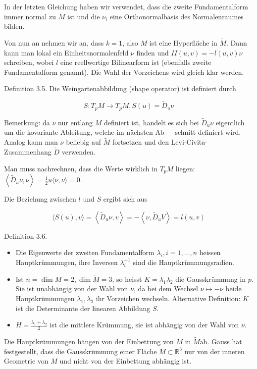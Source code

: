 \documentclass[10pt]{article}
\begin{document}
In der letzten Gleichung haben wir verwendet, dass die zweite Fundamentalform immer normal zu $M$ ist und die $\nu_{i}$ eine Orthonormalbasis des Normalenraumes bilden.

Von nun an nehmen wir an, dass $k=1$, also $M$ ist eine Hyperfläche in $\tilde{M}$. Dann kann man lokal ein Einheitsnormalenfeld $\nu$ finden und $I I(u, v)=-l(u, v) \nu$ schreiben, wobei $l$ eine reellwertige Bilinearform ist (ebenfalls zweite Fundamentalform genannt). Die Wahl der Vorzeichens wird gleich klar werden.

Definition 3.5. Die Weingartenabbildung (shape operator) ist definiert durch

$$
S: T_{p} M \rightarrow T_{p} M, S(u)=\tilde{D}_{u} \nu
$$

Bemerkung: da $\nu$ nur entlang $M$ definiert ist, handelt es sich bei $\tilde{D}_{u} \nu$ eigentlich um die kovariante Ableitung, welche im nächsten $\mathrm{Ab}-$ schnitt definiert wird. Analog kann man $\nu$ beliebig auf $\tilde{M}$ fortsetzen und den Levi-Civita-Zusammenhang $\tilde{D}$ verwenden.

Man muss nachrechnen, dass die Werte wirklich in $T_{p} M$ liegen: $\left\langle\tilde{D}_{u} \nu, \nu\right\rangle=\frac{1}{2} u\langle\nu, \nu\rangle=0$.

Die Beziehung zwischen $l$ und $S$ ergibt sich aus

$$
\langle S(u), v\rangle=\left\langle\tilde{D}_{u} \nu, v\right\rangle=-\left\langle\nu, \tilde{D}_{u} V\right\rangle=l(u, v)
$$

Definition 3.6.

\begin{itemize}
  \item Die Eigenwerte der zweiten Fundamentalform $\lambda_{i}, i=1, \ldots, n$ heissen Hauptkrümmungen, ihre Inversen $\lambda_{i}^{-1}$ sind die Hauptkrümmungsradien.
  \item Ist $n=\operatorname{dim} M=2, \operatorname{dim} \tilde{M}=3$, so heisst $K=\lambda_{1} \lambda_{2}$ die Gausskrümmung in $p$. Sie ist unabhängig von der Wahl von $\nu$, da bei dem Wechsel $\nu \mapsto-\nu$ beide Hauptkrümmungen $\lambda_{1}, \lambda_{2}$ ihr Vorzeichen wechseln. Alternative Definition: $K$ ist die Determinante der linearen Abbildung $S$.
  \item $H=\frac{\lambda_{1}+\lambda_{2}}{2}$ ist die mittlere Krümmung, sie ist abhängig von der Wahl von $\nu$.
\end{itemize}

Die Hauptkrümmungen hängen von der Einbettung von $M$ in $\tilde{M} \mathrm{ab}$. Gauss hat festgestellt, dass die Gausskrümmung einer Fläche $M \subset \mathbb{R}^{3}$ nur von der inneren Geometrie von $M$ und nicht von der Einbettung abhängig ist.
\end{document}

